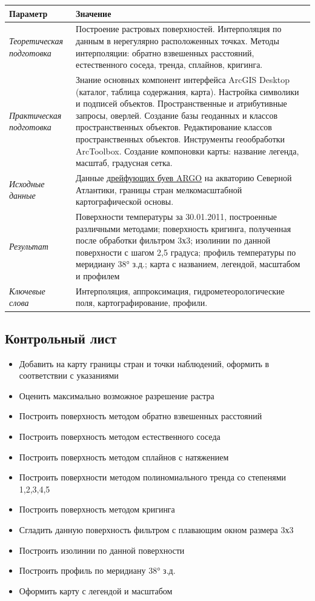 \documentclass[]{book}
\providecommand{\tightlist}{%
  \setlength{\itemsep}{0pt}\setlength{\parskip}{0pt}}
\theoremstyle{definition}
\theoremstyle{definition}
\theoremstyle{definition}
\theoremstyle{remark}
\begin{document}
\begin{longtable}[]{@{}ll@{}}
\toprule
Параметр & Значение\tabularnewline
\midrule
\endhead
\emph{Теоретическая подготовка} & Построение растровых поверхностей.
Интерполяция по данным в нерегулярно расположенных точках. Методы
интерполяции: обратно взвешенных расстояний, естественного соседа,
тренда, сплайнов, кригинга.\tabularnewline
\emph{Практическая подготовка} & Знание основных компонент интерфейса
ArcGIS Desktop (каталог, таблица содержания, карта). Настройка символики
и подписей объектов. Пространственные и атрибутивные запросы, оверлей.
Создание базы геоданных и классов пространственных объектов.
Редактирование классов пространственных объектов. Инструменты
геообработки ArcToolbox. Создание компоновки карты: название легенда,
масштаб, градусная сетка.\tabularnewline
\emph{Исходные данные} & Данные
\href{http://www.argo.ucsd.edu}{дрейфующих буев ARGO} на акваторию
Северной Атлантики, границы стран мелкомасштабной картографической
основы.\tabularnewline
\emph{Результат} & Поверхности температуры за 30.01.2011, построенные
различными методами; поверхность кригинга, полученная после обработки
фильтром 3х3; изолинии по данной поверхности с шагом 2,5 градуса;
профиль температуры по меридиану 38° з.д.; карта с названием, легендой,
масштабом и профилем\tabularnewline
\emph{Ключевые слова} & Интерполяция, аппроксимация,
гидрометеорологические поля, картографирование, профили.\tabularnewline
\bottomrule
\end{longtable}

\hypertarget{interpolation-control}{%
\subsection{Контрольный лист}\label{interpolation-control}}

\begin{itemize}
\tightlist
\item
  Добавить на карту границы стран и точки наблюдений, оформить в
  соответствии с указаниями
\item
  Оценить максимально возможное разрешение растра
\item
  Построить поверхность методом обратно взвешенных расстояний
\item
  Построить поверхность методом естественного соседа
\item
  Построить поверхность методом сплайнов с натяжением
\item
  Построить поверхности методом полиномиального тренда со степенями
  1,2,3,4,5
\item
  Построить поверхность методом кригинга
\item
  Сгладить данную поверхность фильтром с плавающим окном размера 3х3
\item
  Построить изолинии по данной поверхности
\item
  Построить профиль по меридиану 38° з.д.
\item
  Оформить карту с легендой и масштабом
\end{itemize}
\end{document}
